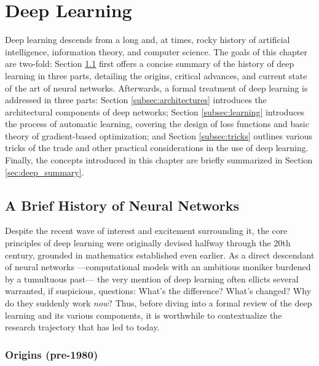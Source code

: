 

\graphicspath{{3/figures/}}

\chapter{Deep Learning}
\label{chp:deep_learning}


Deep learning descends from a long and, at times, rocky history of artificial intelligence, information theory, and computer science.
The goals of this chapter are two-fold:
Section \ref{sec:background} first offers a concise summary of the history of deep learning in three parts, detailing the origins, critical advances, and current state of the art of neural networks.
Afterwards, a formal treatment of deep learning is addressed in three parts:
Section \ref{subsec:architectures} introduces the architectural components of deep networks;
Section \ref{subsec:learning} introduces the process of automatic learning, covering the design of loss functions and basic theory of gradient-based optimization;
and Section \ref{subsec:tricks} outlines various tricks of the trade and other practical considerations in the use of deep learning.
Finally, the concepts introduced in this chapter are briefly summarized in Section \ref{sec:deep_summary}.


\section{A Brief History of Neural Networks}
\label{sec:background}
Despite the recent wave of interest and excitement surrounding it, the core principles of deep learning were originally devised halfway through the 20th century, grounded in mathematics established even earlier.
As a direct descendant of neural networks ---computational models with an ambitious moniker burdened by a tumultuous past--- the very mention of deep learning often ellicts several warranted, if suspicious, questions: What's the difference? What's changed? Why do they suddenly work \emph{now}?
Thus, before diving into a formal review of the deep learning and its various components, it is worthwhile to contextualize the research trajectory that has led to today.


\subsection{Origins (pre-1980)}
\label{subsec:origins}

